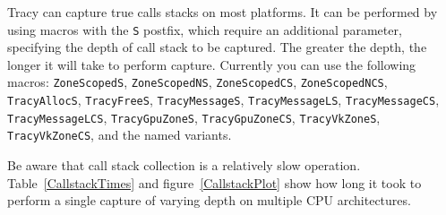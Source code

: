 \documentclass[hidelinks,titlepage,a4paper]{article}
\begin{document}
Tracy can capture true calls stacks on most platforms. It can be performed by using macros with the \texttt{S} postfix, which require an additional parameter, specifying the depth of call stack to be captured. The greater the depth, the longer it will take to perform capture. Currently you can use the following macros: \texttt{ZoneScopedS}, \texttt{ZoneScopedNS}, \texttt{ZoneScopedCS}, \texttt{ZoneScopedNCS}, \texttt{TracyAllocS}, \texttt{TracyFreeS}, \texttt{TracyMessageS}, \texttt{TracyMessageLS}, \texttt{TracyMessageCS}, \texttt{TracyMessageLCS}, \texttt{TracyGpuZoneS}, \texttt{TracyGpuZoneCS}, \texttt{TracyVkZoneS}, \texttt{TracyVkZoneCS}, and the named variants.

Be aware that call stack collection is a relatively slow operation. Table~\ref{CallstackTimes} and figure~\ref{CallstackPlot} show how long it took to perform a single capture of varying depth on multiple CPU architectures.
\end{document}
